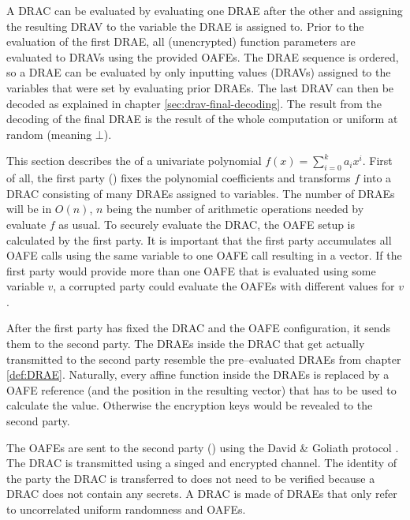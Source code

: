 \label{sec:DRAC-eval}

A DRAC can be evaluated by evaluating one DRAE after the other and assigning the
resulting DRAV to the variable the DRAE is assigned to. Prior to the evaluation
of the first DRAE, all (unencrypted) function parameters are evaluated to DRAVs
using the provided OAFEs. The DRAE sequence is ordered, so a DRAE can be
evaluated by only inputting values (DRAVs) assigned to the variables that were
set by evaluating prior DRAEs. The last DRAV can then be decoded as explained in
chapter \ref{sec:drav-final-decoding}. The result from the decoding of the final
DRAE is the result of the whole computation or uniform at random (meaning
$\bot$).


%
%
\label{sec:OPE}

This section describes the  of a
univariate polynomial $f(x) = \sum_{i=0}^k a_ix^i$. First of all, the first
party (\JWpOne{}) fixes the polynomial coefficients and transforms $f$ into a
DRAC consisting of many DRAEs assigned to variables. The number of DRAEs will be
in $O(n)$, $n$ being the number of arithmetic operations needed by evaluate
$f$ as usual. To securely evaluate the DRAC, the OAFE setup is calculated by
the first party. It is important that the first party accumulates all OAFE calls
using the same variable to one OAFE call resulting in a vector. If the first
party would provide more than one OAFE that is evaluated using some variable
$v$, a corrupted party could evaluate the OAFEs with different values for $v$.

After the first party has fixed the DRAC and the OAFE configuration, it sends
them to the second party. The DRAEs inside the DRAC that get actually
transmitted to the second party resemble the pre--evaluated DRAEs from chapter
\ref{def:DRAE}. Naturally, every affine function inside the DRAEs is replaced by
a OAFE reference (and the position in the resulting vector) that has to be used
to calculate the value. Otherwise the encryption keys would be revealed to the
second party.

The OAFEs are sent to the second party (\JWpTwo{}) using the David \& Goliath
protocol \cite{davidgoliath}. The DRAC is transmitted using a singed and
encrypted channel. The identity of the party the DRAC is transferred to does not
need to be verified because a DRAC does not contain any secrets. A DRAC is made
of DRAEs that only refer to uncorrelated uniform randomness and OAFEs.

